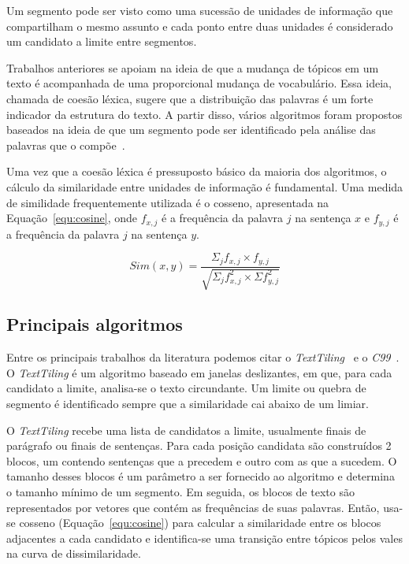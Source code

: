 Um segmento pode ser visto como uma sucessão de unidades de informação que compartilham o mesmo assunto e cada ponto entre duas unidades é considerado um candidato a limite entre segmentos.


Trabalhos anteriores se apoiam na ideia de que a mudança de tópicos em um texto é acompanhada de uma proporcional mudança de vocabulário. Essa ideia, chamada de coesão léxica, sugere que a distribuição das palavras é um forte indicador da estrutura do texto. A partir disso, vários algoritmos foram propostos baseados na ideia de que um segmento pode ser identificado pela análise das palavras que o compõe~\cite{Chen2017,Ferret2009,Sakahara2014}.


Uma vez que a coesão léxica é pressuposto básico da maioria dos algoritmos, o cálculo da similaridade entre unidades de informação é fundamental. Uma medida de similidade frequentemente utilizada é o cosseno, apresentada na Equação~\ref{equ:cosine}, onde $f_{x,j}$ é a frequência da palavra $j$ na sentença $x$ e $f_{y,j}$ é a frequência da palavra $j$ na sentença $y$.
				

\begin{equation}
Sim(x,y) = \frac
{\Sigma_j f_{x,j} \times f_{y,j}}
{\sqrt{\Sigma_j f^2_{x,j} \times \Sigma f^2_{y,j}}}
\label{equ:cosine}
\end{equation}


\subsection{Principais algoritmos}
	\label{subsec:principaisalgoritimos}

Entre os principais trabalhos da literatura podemos citar o  \textit{TextTiling}~\cite{Hearst1994} e o \textit{C99}~\cite{Choi2000}.
%
O \textit{TextTiling} é um algoritmo baseado em janelas deslizantes, em  que, para cada candidato a limite, analisa-se o texto circundante. Um limite ou quebra de segmento é identificado sempre que a similaridade cai abaixo de um limiar.

O \textit{TextTiling} recebe uma lista de candidatos a limite, usualmente finais de parágrafo ou finais de sentenças. Para cada posição candidata são construídos 2 blocos, um contendo sentenças que a precedem e outro com as que a sucedem. O tamanho desses blocos é um parâmetro a ser fornecido ao algoritmo e determina o tamanho mínimo de um segmento.
%
Em seguida, os blocos de texto são representados por vetores que contém as frequências de suas palavras. Então, usa-se cosseno (Equação~\ref{equ:cosine}) para calcular a similaridade entre os blocos adjacentes a cada candidato e identifica-se uma transição entre tópicos pelos vales na curva de dissimilaridade.


